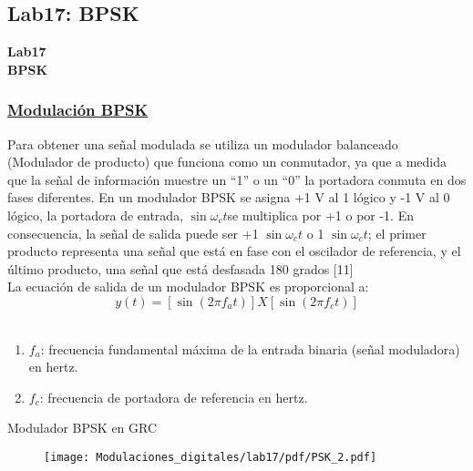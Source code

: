 \subsection{Lab17: BPSK}

\begin{frame}{}


\bfseries{\textrm{\LARGE Lab17\\ \Large BPSK}}
\raggedright
\end{frame}
\begin{frame}


\frametitle{\underline{\textbf{Modulación BPSK}}}

Para obtener una señal modulada se utiliza un modulador balanceado (Modulador de producto) que funciona como un conmutador, ya que a medida que la señal de información muestre un “1” o un “0” la portadora conmuta en dos fases diferentes. En un modulador BPSK se asigna +1 V al 1 lógico y -1 V al 0 lógico, la portadora de entrada, $\sin\omega_{c}t$se multiplica por +1 o por -1. En consecuencia, la señal de salida puede ser +1 $\sin\omega_{c}t$ o 1 $\sin\omega_{c}t$; el primer producto representa una señal que está en fase con el oscilador de referencia, y el último producto, una señal que está desfasada 180 grados [11]\\
La ecuación de salida de un modulador BPSK es proporcional a:\\

$$y(t)=[\sin(2 \pi f_{a}t)]X[\sin(2 \pi f_{c}t)]$$\\

\begin{enumerate}			
	\item{$f_{a}$: frecuencia fundamental máxima de la entrada binaria (señal moduladora) en hertz.}\\
	\item{$f_{c}$: frecuencia de portadora de referencia en hertz.}\\
\end{enumerate}
\end{frame}
\begin{frame}{Modulador BPSK en GRC}
\begin{figure}[H]
\vspace{-3mm}
\centering
\texttt{[image: Modulaciones\_digitales/lab17/pdf/PSK\_2.pdf]}
\end{figure}
\end{frame}
